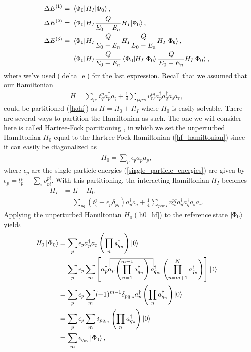 \documentclass[10pt]{article}
\begin{document}
\begin{align}
\label{delta_e1}
\Delta E^{(1)}
=& \ 
\mel{\Phi_0}{H_I}{\Phi_0},
\\
\label{delta_e2}
\Delta E^{(2)}
=& \ 
\mel{\Phi_0}{H_I\frac{Q}{E_0-E_n}H_I}{\Phi_0},
\\
\label{delta_e3}
\Delta E^{(3)}
=& \ 
\mel{\Phi_0}{H_I\frac{Q}{E_0-E_n}H_I\frac{Q}{E_0-E_n}H_I}{\Phi_0},
\\
-& \ 
\mel{\Phi_0}{H_I\frac{Q}{E_0-E_n}\mel{\Phi_0}{H_I}{\Phi_0}\frac{Q}{E_0-E_n}H_I}{\Phi_0},
\end{align}
where we've used (\ref{delta_e}) for the last expression. Recall that we assumed that our Hamiltonian
\begin{align}
H
=
\sum_{pq}t^p_qa^\dagger_pa_q+\frac{1}{4}\sum_{pqrs}v^{pq}_{rs}a^\dagger_pa^\dagger_qa_sa_r,
\end{align}
could be partitioned (\ref{hohi}) as $H=H_0+H_I$ where $H_0$ is easily solvable. There are several ways to partition the Hamiltonian as such. The one we will consider here is called Hartree-Fock partitioning \cite{partition}, in which we set the unperturbed Hamiltonian $H_0$ equal to the Hartree-Fock Hamiltonian (\ref{hf_hamiltonian}) since it can easily be diagonalized as
\begin{align}
\label{h0_hf}
H_0=\sum_p\epsilon_pa^\dagger_pa_p,
\end{align}
where $\epsilon_p$ are the single-particle energies (\ref{single_particle_energies}) are given by $\epsilon_p=t^p_p+\sum_iv^{pi}_{pi}$. With this partitioning, the interacting Hamiltonian $H_I$ becomes
\begin{align}
H_I
&=
H-H_0
\nonumber
\\
&=
\sum_{pq}(t^p_q-\epsilon_p\delta_{pq})a^\dagger_pa_q+\frac{1}{4}\sum_{pqrs}v^{pq}_{rs}a^\dagger_pa^\dagger_qa_sa_r.
\end{align}
Applying the unperturbed Hamiltonian $H_0$ (\ref{h0_hf}) to the reference state $\ket{\Phi_0}$ yields
\begin{align}
H_0\ket{\Phi_0}
&=
\sum_p\epsilon_pa^\dagger_pa_p
\left(\prod_na^\dagger_{q_n}\right)\ket{0}
\\
&=
\sum_p\epsilon_p
\sum_m
\left[
\contraction[3ex]{a^\dagger_p}{a}{_p
\left(\prod_{n=1}^{m-1}a^\dagger_{q_n}\right)}{a}
a^\dagger_pa_p
\left(\prod_{n=1}^{m-1}a^\dagger_{q_n}\right)
a^\dagger_{q_m}
\left(\prod_{n=m+1}^{N}a^\dagger_{q_n}\right)
\right]
\ket{0}
\\
&=
\sum_p\epsilon_p
\sum_m
(-1)^{m-1}
\delta_{pq_m}
a^\dagger_p
\left(\prod_na^\dagger_{q_n}\right)
\ket{0}
\\
&=
\sum_p\epsilon_p
\sum_m
\delta_{pq_m}
\left(\prod_na^\dagger_{q_n}\right)
\ket{0}
\\
&=
\label{h0p0=e0p0}
\sum_{m}\epsilon_{q_m}\ket{\Phi_0},
\end{align}
\end{document}
